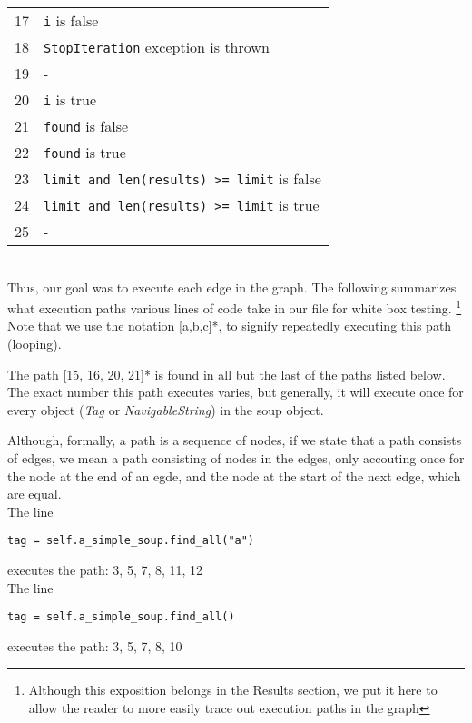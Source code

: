 \documentclass[10pt]{article}
\begin{document}
\begin{tabular}{l|l}
17          & \lstinline[style = pythonstyle]$i$ is false \\
18          & \lstinline[style = pythonstyle]$StopIteration$ exception is thrown \\ 
19          & - \\
20          & \lstinline[style = pythonstyle]$i$ is true \\
21          & \lstinline[style = pythonstyle]$found$ is false \\
22          & \lstinline[style = pythonstyle]$found$ is true \\
23          & \lstinline[style = pythonstyle]$limit and len(results) >= limit$ is false \\
24          & \lstinline[style = pythonstyle]$limit and len(results) >= limit$ is true \\
25          & - 
\end{tabular} \\

Thus, our goal was to execute each edge in the graph. The following summarizes what execution paths various lines of code take in our file for white box testing. \footnote{Although this exposition belongs in the Results section, we put it here to allow the reader to more easily trace out execution paths in the graph} Note that we use the notation [a,b,c]*, to signify repeatedly executing this path (looping). 

The path [15, 16, 20, 21]* is found in all but the last of the paths listed below. The exact number this path executes varies, but generally, it will execute once for every object (\textit{Tag} or \textit{NavigableString}) in the soup object. 

Although, formally, a path is a sequence of nodes, if we state that a path consists of edges, we mean a path consisting of nodes in the edges, only accouting once for the node at the end of an egde, and the node at the start of the next edge, which are equal.  \\


The line
\begin{lstlisting}[style = pythonstyle-small]
tag = self.a_simple_soup.find_all("a")
\end{lstlisting}
executes the path: 3, 5, 7, 8, 11, 12 \\

The line
\begin{lstlisting}[style = pythonstyle-small]
tag = self.a_simple_soup.find_all()
\end{lstlisting}
executes the path: 3, 5, 7, 8, 10 \\
\end{document}
